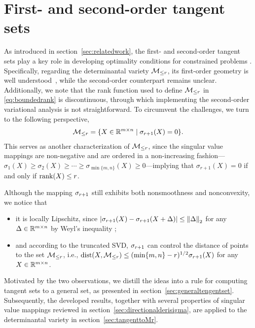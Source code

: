 \section{First- and second-order tangent sets}\label{sec:2tangentset}
As introduced in section~\ref{sec:relatedwork}, the first- and second-order tangent sets play a key role in developing optimality conditions for constrained problems \cite{bonnans2000perturbationanalysis,chen2019exactSOC}. Specifically, regarding the determinantal variety $\mathcal{M}_{\le r}$, its first-order geometry is well understood~\cite{luke2013Mordukhovichcone,vandereycken2013lowrankcompletion,schneider2015Lojaconvergence}, while the second-order counterpart remains unclear. Additionally, we note that the rank function used to define $\mathcal{M}_{\le r}$ in \eqref{eq:boundedrank} is discontinuous, through which implementing the second-order variational analysis is not straightforward. To circumvent the challenges, we turn to the following perspective,
\begin{equation}\label{eq:sigmarboundedrank}
    \mathcal{M}_{\le r}=\{X\in\mathbb{R}^{m\times n}\mid\sigma_{r+1}(X)=0\}.
\end{equation}
This serves as another characterization of $\mathcal{M}_{\le r}$, since the singular value mappings are non-negative and are ordered in a non-increasing fashion---$\sigma_1(X)\ge\sigma_2(X)\ge\cdots\ge\sigma_{\min\{m,n\}}(X)\ge 0$---implying that $\sigma_{r+1}(X)=0$ {if and only if} $\operatorname{rank}(X)\le r$.


Although the mapping $\sigma_{r+1}$ still exhibits both nonsmoothness and nonconvexity, we notice that
\begin{itemize}
    \item[1)] it is locally Lipschitz, since $|\sigma_{r+1}(X)-\sigma_{r+1}(X+\Delta)|\le \left\| {\Delta} \right\|_2$ for any $\Delta\in\mathbb{R}^{m\times n}$ by Weyl's inequality \cite{weyl1912inequality};
    \item[2)] and according to the truncated SVD, $\sigma_{r+1}$ can control the distance of points to the set $\mathcal{M}_{\le r}$, i.e., $\operatorname{dist}(X,\mathcal{M}_{\le r})\le (\min\{m,n\}-r)^{1/2} \sigma_{r+1}(X)$ for any $X\in\mathbb{R}^{m\times n}$.
\end{itemize}
Motivated by the two observations, we distill the ideas into a rule for computing tangent sets to a general set, as presented in section~\ref{sec:generaltengentset}. Subsequently, the developed results, together with several properties of singular value mappings reviewed in section~\ref{sec:directionalderisigma}, are applied to the determinantal variety in section~\ref{sec:tangenttoMr}.

